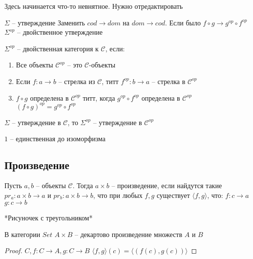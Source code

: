 Здесь начинается что-то невнятное. Нужно отредактировать

\begin{defn}
  $\Sigma$ -- утверждение
  Заменить $cod \to dom$ на $dom \to cod$. Если было
  $f \circ g \to g^{op} \circ f^{op}$
  $\Sigma^{op}$ -- двойственное утверждение
\end{defn}

\begin{defn}
  $\Sigma^{op}$ -- двойственная категория к $\mathcal{C}$, если:
  \begin{enumerate}
    \item Все объекты $\mathcal{C}^{op}$ -- это $\mathcal{C}$-объекты
    \item Если $f \colon a \to b$ -- стрелка из $\mathcal{C}$, титт $f^{op}
      \colon b \to a$ -- стрелка в $\mathcal{C}^{op}$
    \item $f \circ g$ определена в $\mathcal{C}^{op}$ титт, когда $g^{op} \circ
      f^{op}$ определена в $\mathcal{C}^{op}$
      $(f \circ g)^{op} = g^{op} \circ f^{op}$
  \end{enumerate}
\end{defn}

\begin{task}
  $\Sigma$ -- утверждение в $\mathcal{C}$, то $\Sigma^{op}$ -- утверждение в $\mathcal{C}^{op}$
\end{task}

\begin{task}
  $1$ -- единственная до изоморфизма
\end{task}

\subsection{Произведение}
Пусть $a, b$ -- объекты $\mathcal{C}$. Тогда $a \times b$ -- произведение, если
найдутся такие $pr_a \colon a \times b \to a$ и $pr_b \colon a \times b \to b$,
что при любых $f, g$ существует $\langle f, g \rangle$, что:
$f \colon c \to a$
$g \colon c \to b$

*Рисуночек с треугольником*

\begin{stmt}
  В категории $Set$ $A \times B$ -- декартово произведение множеств $A$ и $B$
\end{stmt}
\begin{proof}
  $C, f \colon C \to A, g \colon C \to B$
  $\langle f, g \rangle (c) = \langle (f(c), g(c)) \rangle$
\end{proof}

